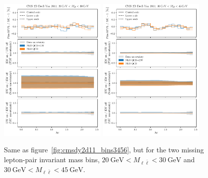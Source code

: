\begin{figure}[!p]
    \centering
    \includegraphics[width=0.46\textwidth]{figures/pineappl_CMSDY2D11_bin1}%
    \includegraphics[width=0.46\textwidth]{figures/pineappl_CMSDY2D11_bin2}\\
    \caption{Same as figure~\ref{fig:cmsdy2d11_bins3456}, but for the two missing
      lepton-pair invariant mass bins,
      $\SI{20}{\giga\electronvolt}<M_{\ell\bar\ell}<\SI{30}{\giga\electronvolt}$ and
      $\SI{30}{\giga\electronvolt}<M_{\ell\bar\ell}<\SI{45}{\giga\electronvolt}$.}
    \label{fig:cmsdy2d11_bins12}
\end{figure}

